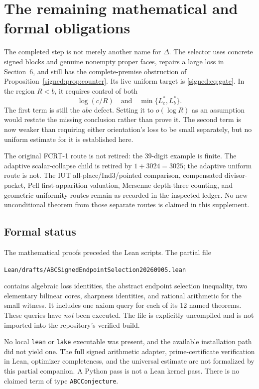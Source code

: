 \section{The remaining mathematical and formal obligations}
The completed step is not merely another name for \(\Delta\). The selector uses concrete signed blocks and genuine nonempty proper faces, repairs a large loss in Section~6, and still has the complete-premise obstruction of Proposition~\ref{signed:prop:counter}. Its live uniform target is \eqref{signed:eq:gate}. In the region \(R<b\), it requires control of both
\[
 \log(c/R)\quad\text{and}\quad \min\{L_c^*,L_b^*\}.
\]
The first term is still the \(abc\) defect. Setting it to \(o(\log R)\) as an assumption would restate the missing conclusion rather than prove it. The second term is now weaker than requiring either orientation's loss to be small separately, but no uniform estimate for it is established here.

The original FCRT-1 route is not retired: the 39-digit example is finite. The adaptive scalar-collapse child is retired by \(1+3024=3025\); the adaptive uniform route is not. The IUT all-place/Ind3/pointed comparison, compensated divisor-packet, Pell first-apparition valuation, Mersenne depth-three counting, and geometric uniformity routes remain as recorded in the inspected ledger. No new unconditional theorem from those separate routes is claimed in this supplement.

\subsection{Formal status}
The mathematical proofs preceded the Lean scripts. The partial file
\begin{center}\small\texttt{Lean/drafts/ABCSignedEndpointSelection20260905.lean}\end{center}
contains algebraic loss identities, the abstract endpoint selection inequality, two elementary bilinear cores, sharpness identities, and rational arithmetic for the small witness. It includes one axiom query for each of its 12 named theorems. These queries have \emph{not} been executed. The file is explicitly uncompiled and is not imported into the repository's verified build.

No local \texttt{lean} or \texttt{lake} executable was present, and the available installation path did not yield one. The full signed arithmetic adapter, prime-certificate verification in Lean, optimizer completeness, and the universal estimate are not formalized by this partial companion. A Python pass is not a Lean kernel pass. There is no claimed term of type \texttt{ABCConjecture}.

